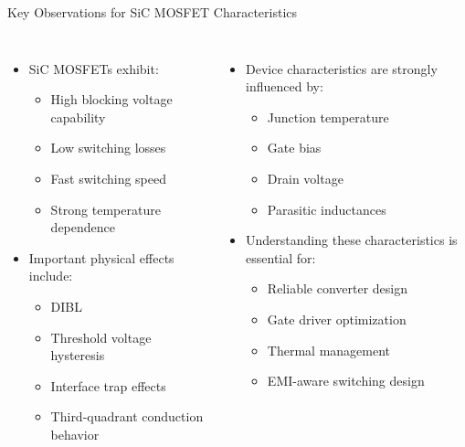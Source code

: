 \begin{frame}{Key Observations for SiC MOSFET Characteristics}
\begin{columns}
\begin{itemize}
    \item SiC MOSFETs exhibit:
    \begin{itemize}
        \item High blocking voltage capability
        \item Low switching losses
        \item Fast switching speed
        \item Strong temperature dependence
    \end{itemize}

    \item Important physical effects include:
    \begin{itemize}
        \item DIBL
        \item Threshold voltage hysteresis
        \item Interface trap effects
        \item Third-quadrant conduction behavior
    \end{itemize}
\end{itemize}
\begin{itemize}
    \item Device characteristics are strongly influenced by:
    \begin{itemize}
        \item Junction temperature
        \item Gate bias
        \item Drain voltage
        \item Parasitic inductances
    \end{itemize}

    \item Understanding these characteristics is essential for:
    \begin{itemize}
        \item Reliable converter design
        \item Gate driver optimization
        \item Thermal management
        \item EMI-aware switching design
    \end{itemize}
\end{itemize}
\end{columns}
\end{frame}


